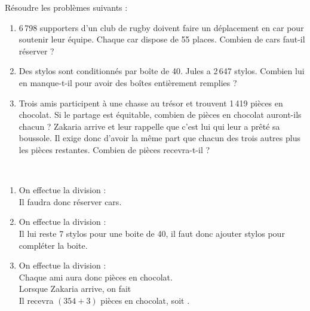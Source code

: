 \begin{colonne*exercice}
\bigskip


\begin{exercice} %
   Résoudre les problèmes suivants :
   \begin{enumerate}
      \item 6\,798 supporters d'un club de rugby doivent faire un déplacement en car pour soutenir leur équipe. Chaque car dispose de 55 places. Combien de cars faut-il réserver ?
      \item Des stylos sont conditionnés par boîte de 40. Jules a 2\,647 stylos. Combien lui en manque-t-il pour avoir des boîtes entièrement remplies ?
      \item Trois amis participent à une chasse au trésor et trouvent 1\,419 pièces en chocolat. Si le partage est équitable, combien de pièces en chocolat auront-ils chacun ? Zakaria arrive et leur rappelle que c'est lui qui leur a prêté sa boussole. Il exige donc d'avoir la même part que chacun des trois autres plus les pièces restantes. Combien de pièces recevra-t-il ?
   \end{enumerate}
\end{exercice}

\begin{corrige}
   \ \\ [-5mm]
   \begin{enumerate}
      \item On effectue la division : {\small {}} \\
         Il faudra donc réserver { cars}.
      \item On effectue la division : {\small {}} \\
         Il lui reste 7 stylos pour une boite de 40, il faut donc ajouter { stylos} pour compléter la boite.
      \item On effectue la division : {\small {}} \\
         Chaque ami aura donc { pièces en chocolat}. \\
         Lorsque Zakaria arrive, on fait {\small {}} \\
         Il recevra $(354+3)$ pièces en chocolat, soit {}.
   \end{enumerate}
\end{corrige}

\bigskip



\end{colonne*exercice}
